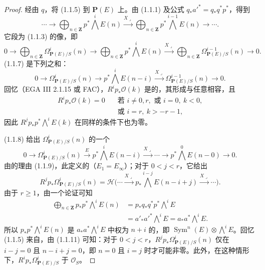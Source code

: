 \begin{proof}
经由 $q$，将 (1.1.5) 到 $\mathbf P(E)$ 上。由 (1.1.1) 及公式 $q_*a'^*=q_*q^*p^*$，得到
\[
 \cdots\longrightarrow\bigoplus_{n\in\mathbf Z}p^*\bigwedge^iE(n)\xrightarrow{X\mathbin{\lrcorner}}\bigoplus_{n\in\mathbf Z}p^*\bigwedge^{i-1}E(n)\longrightarrow\cdots.\tag{1.1.6}
\]
它段为 (1.1.3) 的像，即
\[
0\longrightarrow\bigoplus_{n\in\mathbf Z}\Omega^i_{\mathbf P(E)/S}(n)\longrightarrow\bigoplus_{n\in\mathbf Z}p^*\bigwedge^iE(n)\xrightarrow{X\mathbin{\lrcorner}}\bigoplus_{n\in\mathbf Z}\Omega^{i-1}_{\mathbf P(E)/S}(n)\longrightarrow0.\tag{1.1.7}
\]
 (1.1.7) 是下列之和：
\[
0\longrightarrow\Omega^i_{\mathbf P(E)/S}(n)\longrightarrow p^*\bigwedge^iE(n-i)\xrightarrow{X\mathbin{\lrcorner}}\Omega^{i-1}_{\mathbf P(E)/S}(n)\longrightarrow0.\tag{1.1.8}
\]
回忆（EGA III 2.1.15 或 FAC），$R^ip_*\mathcal O(k)$ 是的，其形成与任意相容，且
\[
\begin{split}
R^ip_*\mathcal O(k)=0\quad&\text{若 }i\ne0,r,\text{ 或 }i=0,\ k<0,\\
&\text{或 }i=r,\ k>-r-1,
\end{split}\tag{1.1.9}
\]
因此 $R^jp_*p^*\bigwedge^iE(k)$ 在同样的条件下也为零。

 (1.1.8) 给出 $\Omega^i_{\mathbf P(E)/S}(n)$ 的一个
\[
0\longrightarrow\Omega^i_{\mathbf P(E)/S}(n)\xrightarrow{E}p^*\bigwedge^iE(n-i)\xrightarrow{X\mathbin{\lrcorner}}\cdots\longrightarrow p^*\bigwedge^0E(n-0)\longrightarrow0.\tag{1.1.10}
\]
由的理由 (1.1.9)，此定义的（$E_1=E_\infty$）；对于 $0<j<r$，它给出
\[
R^jp_*\Omega^i_{\mathbf P(E)/S}(n)=\mathscr H\bigl(\cdots\xrightarrow{X\mathbin{\lrcorner}}p_*\bigwedge^{i-j}E(n-i+j)\xrightarrow{X\mathbin{\lrcorner}}\cdots\bigr).\tag{1.1.11}
\]
由于 $r\geq1$，由一个论证可知
\[
\begin{split}
\bigoplus_{n\in\mathbf Z}p_*p^*\bigwedge^iE(n)
&=p_*q_*q^*p^*\bigwedge^iE\\
&=a'_*a'^*\bigwedge^iE=a_*a^*\bigwedge^iE.
\end{split}\tag{1.1.12}
\]
所以 $p_*p^*\bigwedge^iE(n)$ 是 $a_*a^*\bigwedge^iE$ 中权为 $n+i$ 的，即 $\operatorname{Sym}^n(E)\otimes\bigwedge^iE$。回忆 (1.1.5) 来自，由 (1.1.11) 可知：对于 $0<j<r$，$R^jp_*\Omega^i_{\mathbf P(E)/S}(n)$ 仅在 $i-j=0$ 且 $n-i+j=0$，即 $n=0$ 且 $i=j$ 时才可能非零。此外，在这种情形下，$R^ip_*\Omega^i_{\mathbf P(E)/S}$ 于 $\mathcal O_S$。


\end{proof}
